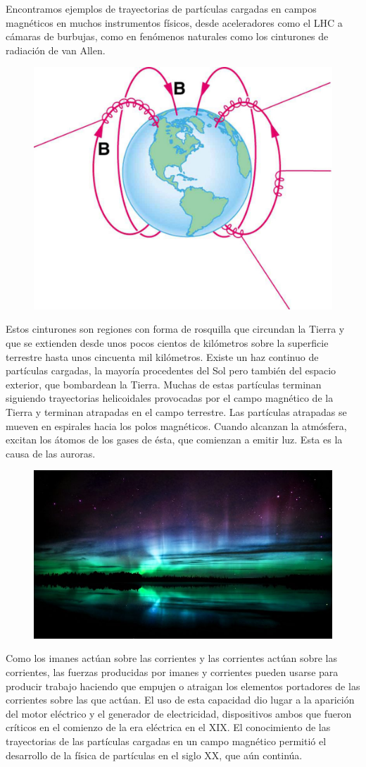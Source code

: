 \begin{multicols}{2}
\small{Encontramos ejemplos de trayectorias de partículas cargadas en campos magnéticos en muchos instrumentos físicos, desde aceleradores como el LHC a cámaras de burbujas, como en fenómenos naturales como los cinturones de radiación de van Allen.}
\begin{figure}[H]
	\centering
	\includegraphics[width=.4\textwidth]{imagenes/imagenes26/T26IM18.png}
	\end{figure}
\small{Estos cinturones son regiones con forma de rosquilla que circundan la Tierra y que se extienden desde unos pocos cientos de kilómetros sobre la superficie terrestre hasta unos cincuenta mil kilómetros. Existe un haz continuo de partículas cargadas, la mayoría procedentes del Sol pero también del espacio exterior, que bombardean la Tierra. Muchas de estas partículas terminan siguiendo trayectorias helicoidales provocadas por el campo magnético de la Tierra y terminan atrapadas en el campo terrestre. Las partículas atrapadas se mueven en espirales hacia los polos magnéticos. Cuando alcanzan la atmósfera, excitan los átomos de los gases de ésta, que comienzan a emitir luz. Esta es la causa de las auroras.}
\begin{figure}[H]
	\centering
	\includegraphics[width=.4\textwidth]{imagenes/imagenes26/T26IM19.png}
	\end{figure}
\small{Como los imanes actúan sobre las corrientes y las corrientes actúan sobre las corrientes, las fuerzas producidas por imanes y corrientes pueden usarse para producir trabajo haciendo que empujen o atraigan los elementos portadores de las corrientes sobre las que actúan. El uso de esta capacidad dio lugar a la aparición del motor eléctrico y el generador de electricidad, dispositivos ambos que fueron críticos en el comienzo de la era eléctrica en el XIX. El conocimiento de las trayectorias de las partículas cargadas en un campo magnético permitió el desarrollo de la física de partículas en el siglo XX, que aún continúa.}
\end{multicols}	

